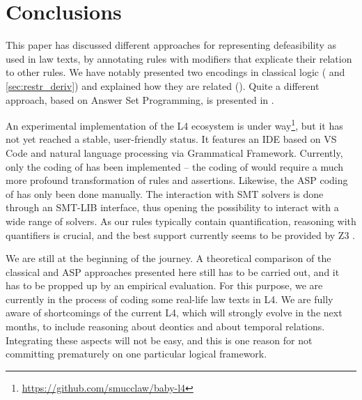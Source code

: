 \section{Conclusions}\label{sec:conclusions}

This paper has discussed different approaches for representing defeasibility
as used in law texts, by annotating rules with modifiers that explicate their
relation to other rules. We have notably presented two encodings in classical
logic ( and \ref{sec:restr_deriv}) and explained
how they are related (). Quite a different approach,
based on Answer Set Programming, is presented in
.

An experimental implementation of the L4 ecosystem is under
way\footnote{\url{https://github.com/smucclaw/baby-l4}}, but it has not yet
reached a stable, user-friendly status. It features an IDE based on VS Code
and natural language processing via Grammatical
Framework\cite{ranta_grammatical_2004}. Currently, only the coding of
 has been implemented -- the coding of
 would require a much more profound transformation of
rules and assertions. Likewise, the ASP coding of 
has only been done manually. The interaction with SMT solvers is done through
an SMT-LIB \cite{BarFT_SMTLIB} interface, thus opening the possibility to
interact with a wide range of solvers. As our rules typically contain
quantification, reasoning with quantifiers is crucial, and the
best support currently seems to be provided by Z3 \cite{demoura_bjorner_z3_2008}.

We are still at the beginning of the journey. A theoretical comparison of the
classical and ASP approaches presented here still has to be carried out, and
it has to be propped up by an empirical evaluation. For this purpose, we are
currently in the process of coding some real-life law texts in L4. We are
fully aware of shortcomings of the current L4, which will strongly evolve in
the next months, to include reasoning about deontics and about temporal
relations. Integrating these aspects will not be easy, and this is one reason
for not committing prematurely on one particular logical framework.


